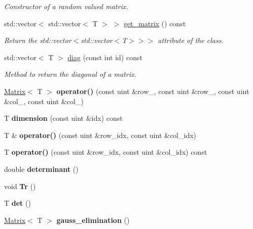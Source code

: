 \begin{DoxyCompactItemize}
\begin{DoxyCompactList}\small\item\em Constructor of a random valued matrix. \end{DoxyCompactList}\item 
\mbox{\label{classMatrix_a42241ef961d7b919f3ec952e16ae0b55}} 
std\+::vector$<$ std\+::vector$<$ T $>$ $>$ \hyperlink{classMatrix_a42241ef961d7b919f3ec952e16ae0b55}{get\+\_\+matrix} () const
\begin{DoxyCompactList}\small\item\em Return the std\+::vector$<$std\+::vector$<$\+T$>$$>$$>$ attribute of the class. \end{DoxyCompactList}\item 
std\+::vector$<$ T $>$ \hyperlink{classMatrix_afdc70f8e656996481f5a6b970189c64b}{diag} (const int id) const
\begin{DoxyCompactList}\small\item\em Method to return the diagonal of a matrix. \end{DoxyCompactList}\item 
\mbox{\label{classMatrix_a3a9452f46689001f2f262f13d4600ea9}} 
\hyperlink{classMatrix}{Matrix}$<$ T $>$ {\bfseries operator()} (const uint \&row\+\_, const uint \&row\+\_, const uint \&col\+\_, const uint \&col\+\_)
\item 
\mbox{\label{classMatrix_afdf86fadf4ac353f6f32e780a5016c25}} 
T {\bfseries dimension} (const uint \&idx) const
\item 
\mbox{\label{classMatrix_a8396ba9c5609d2fb1014262fbf172479}} 
T \& {\bfseries operator()} (const uint \&row\+\_\+idx, const uint \&col\+\_\+idx)
\item 
\mbox{\label{classMatrix_ae6ab8af0e5d03eb8fe5f31d037b2e207}} 
T {\bfseries operator()} (const uint \&row\+\_\+idx, const uint \&col\+\_\+idx) const
\item 
\mbox{\label{classMatrix_aa0347b091217f8ea2a928efd860d4d26}} 
double {\bfseries determinant} ()
\item 
\mbox{\label{classMatrix_abb26547343d449fbedc5bd3b24120927}} 
void {\bfseries Tr} ()
\item 
\mbox{\label{classMatrix_af531b530699d08cb75b3ceabf22618fb}} 
T {\bfseries det} ()
\item 
\mbox{\label{classMatrix_afe220c54165e01d7b3d528c8425aff07}} 
\hyperlink{classMatrix}{Matrix}$<$ T $>$ {\bfseries gauss\+\_\+elimination} ()
\end{DoxyCompactItemize}
